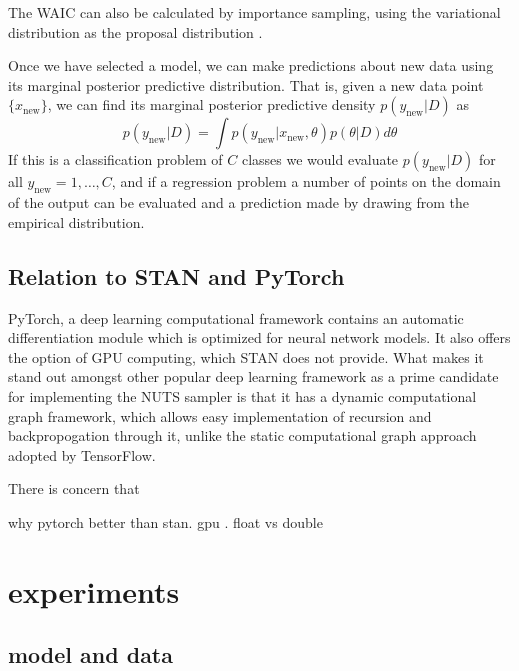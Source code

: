 \documentclass[]{report}
\begin{document}
The WAIC can also be calculated by importance sampling, using the variational distribution as the proposal distribution \cite{yamada2012information}.

Once we have selected a model, we can make predictions about new data using its marginal posterior predictive distribution. That is, given a new data point $\{x_{\text{new}}\}$, we can find its marginal posterior predictive density $p(y_{\text{new}}|D)$ as 
\[ p(y_{\text{new}}|D) = \int p(y_{\text{new}}|x_{\text{new}},\theta) p(\theta|D) d\theta \]
If this is a classification problem of $C$ classes we would evaluate $p(y_{\text{new}}|D)$ for all $y_{\text{new}}=1,\dots, C$, and if a regression problem a number of points on the domain of the output can be evaluated 
and a prediction made by drawing from the empirical distribution. 
\section{Relation to STAN and PyTorch}

PyTorch, a deep learning computational framework contains an automatic differentiation module which is optimized for neural network models. It also offers the option of GPU computing, which STAN does not provide. What makes it stand out amongst other popular deep learning framework as a prime candidate for implementing the NUTS sampler is that it has a dynamic computational graph framework, which allows easy implementation of recursion and backpropogation through it, unlike the static computational graph approach adopted by TensorFlow.

There is concern that 

why pytorch better than stan. gpu . float vs double 



\chapter{experiments}
\section{model and data}
\end{document}
